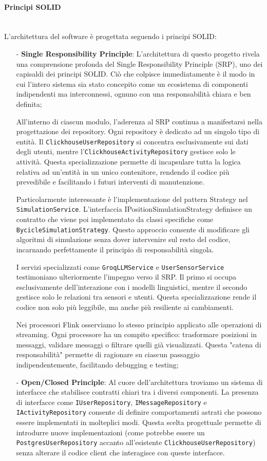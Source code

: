 \documentclass[10pt]{article}
\newcommand{\myparagraph}[1]{\paragraph{#1}\mbox{}\\}
\begin{document}
    \myparagraph{Principi SOLID}
    L'architettura del software è progettata seguendo i principi SOLID:
    \begin{itemize}
        \item[-] \textbf{Single Responsibility Principle}: L'architettura di questo progetto rivela una comprensione profonda del Single Responsibility Principle (SRP), uno dei capisaldi dei principi SOLID. Ciò che colpisce immediatamente è il modo in cui l'intero sistema sia stato concepito come un ecosistema di componenti indipendenti ma interconnessi, ognuno con una responsabilità chiara e ben definita;

        All'interno di ciascun modulo, l'aderenza al SRP continua a manifestarsi nella progettazione dei repository. Ogni repository è dedicato ad un singolo tipo di entità. Il \texttt{ClickhouseUserRepository} si concentra esclusivamente sui dati degli utenti, mentre l'\texttt{ClickhouseActivityRepository} gestisce solo le attività. Questa specializzazione permette di incapsulare tutta la logica relativa ad un'entità in un unico contenitore, rendendo il codice più prevedibile e facilitando i futuri interventi di manutenzione.

        Particolarmente interessante è l'implementazione del pattern Strategy nel \texttt{SimulationService}. L'interfaccia IPositionSimulationStrategy definisce un contratto che viene poi implementato da classi specifiche come \texttt{BycicleSimulationStrategy}. Questo approccio consente di modificare gli algoritmi di simulazione senza dover intervenire sul resto del codice, incarnando perfettamente il principio di responsabilità singola.

        I servizi specializzati come \texttt{GroqLLMService} e \texttt{UserSensorService} testimoniano ulteriormente l'impegno verso il SRP. Il primo si occupa esclusivamente dell'interazione con i modelli linguistici, mentre il secondo gestisce solo le relazioni tra sensori e utenti. Questa specializzazione rende il codice non solo più leggibile, ma anche più resiliente ai cambiamenti.

        Nei processori Flink osserviamo lo stesso principio applicato alle operazioni di streaming. Ogni processore ha un compito specifico: trasformare posizioni in messaggi, validare messaggi o filtrare quelli già visualizzati. Questa "catena di responsabilità" permette di ragionare su ciascun passaggio indipendentemente, facilitando debugging e testing;
        
        \item[-] \textbf{Open/Closed Principle}: Al cuore dell'architettura troviamo un sistema di interfacce che stabilisce contratti chiari tra i diversi componenti. La presenza di interfacce come \texttt{IUserRepository}, \texttt{IMessageRepository} e \texttt{IActivityRepository} consente di definire comportamenti astrati che possono essere implementati in molteplici modi. Questa scelta progettuale permette di introdurre nuove implementazioni (come potrebbe essere un \texttt{PostgresUserRepository} accanto all'esistente \texttt{ClickhouseUserRepository}) senza alterare il codice client che interagisce con queste interfacce.


\end{itemize}
\end{document}
